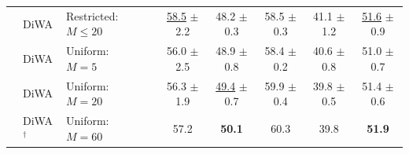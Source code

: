 \begin{table}[h]
{\begin{tabular}{llll|ccccc}
             & DiWA                                               & Restricted: $M \leq 20$   &                                                & \underline{58.5} $\pm$ 2.2 & 48.2 $\pm$ 0.3             & 58.5 $\pm$ 0.3          & 41.1 $\pm$ 1.2             & \underline{51.6} $\pm$ 0.9 \\
             & DiWA                                               & Uniform: $M=5$            &                                                & 56.0 $\pm$ 2.5             & 48.9 $\pm$ 0.8             & 58.4 $\pm$ 0.2          & 40.6 $\pm$ 0.8             & 51.0 $\pm$ 0.7             \\
             & DiWA                                               & Uniform: $M=20$           &                                                & 56.3 $\pm$ 1.9             & \underline{49.4} $\pm$ 0.7 & 59.9 $\pm$ 0.4          & 39.8 $\pm$ 0.5             & 51.4 $\pm$ 0.6             \\
             & DiWA$^{\dagger}$                                   & Uniform: $M=60$           &                                                & 57.2                       & \textbf{50.1}              & 60.3                    & 39.8                       & \textbf{51.9}              \\
            \bottomrule
        \end{tabular}}
\end{table}






